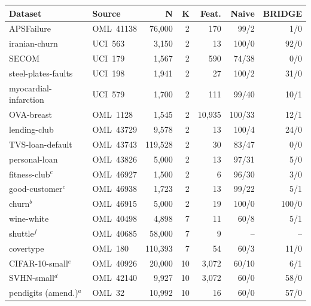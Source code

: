 \begin{table}[!t]
\begin{minipage}[t]{0.494\textwidth}
\begin{tabular}[t]{@{}llrrrrr@{}}
\toprule
Dataset & Source & N & K & Feat. & Naive & BRIDGE \\
\midrule
APSFailure & OML~41138 & 76,000 & 2 & 170 & 99/2 & 1/0 \\
iranian-churn & UCI~563 & 3,150 & 2 & 13 & 100/0 & 92/0 \\
SECOM & UCI~179 & 1,567 & 2 & 590 & 74/38 & 0/0 \\
steel-plates-faults & UCI~198 & 1,941 & 2 & 27 & 100/2 & 31/0 \\
myocardial-infarction & UCI~579 & 1,700 & 2 & 111 & 99/40 & 10/1 \\
OVA-breast & OML~1128 & 1,545 & 2 & 10,935 & 100/33 & 12/1 \\
lending-club & OML~43729 & 9,578 & 2 & 13 & 100/4 & 24/0 \\
TVS-loan-default & OML~43743 & 119,528 & 2 & 30 & 83/47 & 0/0 \\
personal-loan & OML~43826 & 5,000 & 2 & 13 & 97/31 & 5/0 \\
fitness-club$^{c}$ & OML~46927 & 1,500 & 2 & 6 & 96/30 & 3/0 \\
good-customer$^{c}$ & OML~46938 & 1,723 & 2 & 13 & 99/22 & 5/1 \\
churn$^{b}$ & OML~46915 & 5,000 & 2 & 19 & 100/0 & 100/0 \\
wine-white & OML~40498 & 4,898 & 7 & 11 & 60/8 & 5/1 \\
shuttle$^{f}$ & OML~40685 & 58,000 & 7 & 9 & -- & -- \\
covertype & OML~180 & 110,393 & 7 & 54 & 60/3 & 11/0 \\
CIFAR-10-small$^{e}$ & OML~40926 & 20,000 & 10 & 3,072 & 60/10 & 6/1 \\
SVHN-small$^{d}$ & OML~42140 & 9,927 & 10 & 3,072 & 60/0 & 58/0 \\
pendigits (amend.)$^{a}$ & OML~32 & 10,992 & 10 & 16 & 60/0 & 57/0 \\
\bottomrule
\end{tabular}
\end{minipage}


\end{table}

